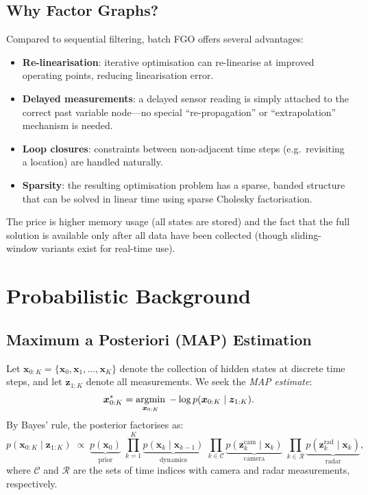\documentclass[11pt,a4paper]{article}
\newcommand{\state}{\bm{x}}
\newcommand{\meas}{\bm{z}}
\newcommand{\argmin}{\operatornamewithlimits{argmin}}
\begin{document}
\subsection*{Why Factor Graphs?}
Compared to sequential filtering, batch FGO offers several advantages:
\begin{itemize}[nosep]
  \item \textbf{Re-linearisation}: iterative optimisation can re-linearise
        at improved operating points, reducing linearisation error.
  \item \textbf{Delayed measurements}: a delayed sensor reading is simply
        attached to the correct past variable node---no special
        ``re-propagation'' or ``extrapolation'' mechanism is needed.
  \item \textbf{Loop closures}: constraints between non-adjacent time
        steps (e.g.\ revisiting a location) are handled naturally.
  \item \textbf{Sparsity}: the resulting optimisation problem has a
        sparse, banded structure that can be solved in linear time using
        sparse Cholesky factorisation.
\end{itemize}

The price is higher memory usage (all states are stored) and the fact
that the full solution is available only after all data have been
collected (though sliding-window variants exist for real-time use).

\section{Probabilistic Background}
\label{sec:background}

\subsection{Maximum a Posteriori (MAP) Estimation}

Let $\state_{0:K} = \{\state_0, \state_1, \ldots, \state_K\}$ denote the
collection of hidden states at discrete time steps, and let
$\meas_{1:K}$ denote all measurements.  We seek the \emph{MAP estimate}:
\begin{equation}
  \state_{0:K}^{*}
  = \argmin_{\state_{0:K}} \; -\log p(\state_{0:K} \mid \meas_{1:K}).
  \label{eq:map}
\end{equation}
By Bayes' rule, the posterior factorises as:
\begin{equation}
  p(\state_{0:K} \mid \meas_{1:K})
  \;\propto\;
  \underbrace{p(\state_0)}_{\text{prior}}
  \;\prod_{k=1}^{K}
  \underbrace{p(\state_k \mid \state_{k-1})}_{\text{dynamics}}
  \;\prod_{k \in \mathcal{C}}
  \underbrace{p(\meas_k^{\text{cam}} \mid \state_k)}_{\text{camera}}
  \;\prod_{k \in \mathcal{R}}
  \underbrace{p(\meas_k^{\text{rad}} \mid \state_k)}_{\text{radar}},
  \label{eq:factorisation}
\end{equation}
where $\mathcal{C}$ and $\mathcal{R}$ are the sets of time indices with
camera and radar measurements, respectively.
\end{document}
